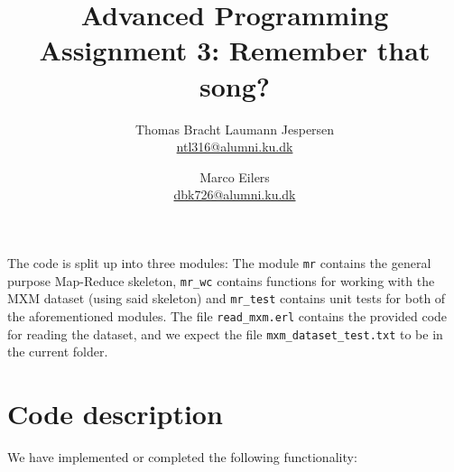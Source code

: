 \documentclass[a4paper]{article}
\title{Advanced Programming\\ Assignment 3: Remember that song?}
\author{Thomas Bracht Laumann Jespersen\\ \url{ntl316@alumni.ku.dk} \and Marco Eilers\\ \url{dbk726@alumni.ku.dk} }
\begin{document}
\maketitle

The code is split up into three modules: The module \texttt{mr}
 contains the general purpose Map-Reduce skeleton, \texttt{mr\_wc} contains functions for working with the MXM dataset
 (using said skeleton) and \texttt{mr\_test} contains
  unit tests for both of the aforementioned modules. The file \texttt{read\_mxm.erl} contains the provided code for reading the dataset, and we expect the file \texttt{mxm\_dataset\_test.txt} to be in the current folder.

\section*{Code description}
We have implemented or completed the following functionality:
\end{document}

